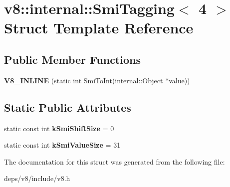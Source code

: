 \hypertarget{structv8_1_1internal_1_1_smi_tagging_3_014_01_4}{}\section{v8\+:\+:internal\+:\+:Smi\+Tagging$<$ 4 $>$ Struct Template Reference}
\label{structv8_1_1internal_1_1_smi_tagging_3_014_01_4}
\subsection*{Public Member Functions}
\begin{DoxyCompactItemize}
\item 
\hypertarget{structv8_1_1internal_1_1_smi_tagging_3_014_01_4_ab68c5c5fa7a1624f847b641c2fa20a65}{}{\bfseries V8\+\_\+\+I\+N\+L\+I\+N\+E} (static int Smi\+To\+Int(internal\+::\+Object $\ast$value))\label{structv8_1_1internal_1_1_smi_tagging_3_014_01_4_ab68c5c5fa7a1624f847b641c2fa20a65}

\end{DoxyCompactItemize}
\subsection*{Static Public Attributes}
\begin{DoxyCompactItemize}
\item 
\hypertarget{structv8_1_1internal_1_1_smi_tagging_3_014_01_4_a4230f8d72054619f8141d0524733d8e9}{}static const int {\bfseries k\+Smi\+Shift\+Size} = 0\label{structv8_1_1internal_1_1_smi_tagging_3_014_01_4_a4230f8d72054619f8141d0524733d8e9}

\item 
\hypertarget{structv8_1_1internal_1_1_smi_tagging_3_014_01_4_a0857bbaab799b39a51f578744bf855f8}{}static const int {\bfseries k\+Smi\+Value\+Size} = 31\label{structv8_1_1internal_1_1_smi_tagging_3_014_01_4_a0857bbaab799b39a51f578744bf855f8}

\end{DoxyCompactItemize}


The documentation for this struct was generated from the following file\+:\begin{DoxyCompactItemize}
\item 
deps/v8/include/v8.\+h\end{DoxyCompactItemize}
